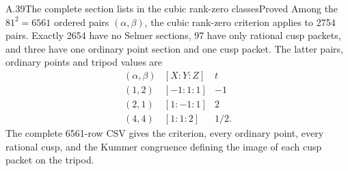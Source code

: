 \begin{statement}{A.39}{The complete section lists in the cubic rank-zero classes}{Proved}
Among the $81^2=6561$ ordered pairs $(\alpha,\beta)$, the cubic
rank-zero criterion applies to 2754 pairs. Exactly 2654 have no Selmer
sections, 97 have only rational cusp packets, and three have one ordinary
point section and one cusp packet. The latter pairs, ordinary points and
tripod values are
\[
\begin{array}{c|c|c}
(\alpha,\beta)&[X:Y:Z]&t\\\hline
(1,2)&[-1:1:1]&-1\\
(2,1)&[1:-1:1]&2\\
(4,4)&[1:1:2]&1/2.
\end{array}
\]
The complete 6561-row CSV gives the criterion, every ordinary point, every
rational cusp, and the Kummer congruence defining the image of each cusp
packet on the tripod.
\end{statement}
